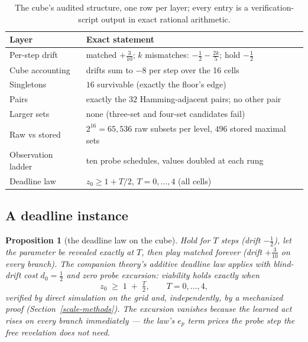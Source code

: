 \documentclass[10pt,twocolumn]{article}
\theoremstyle{plain}
\newtheorem{proposition}[theorem]{Proposition}
\theoremstyle{definition}
\theoremstyle{remark}
\begin{document}
\begin{table}[t]
\centering\footnotesize
\caption{The cube's audited structure, one row per layer; every entry is a
verification-script output in exact rational arithmetic.}
\label{scale-tab:glance}
\begin{tabular}{@{}l p{4.9cm}@{}}
\toprule
Layer & Exact statement \\
\midrule
Per-step drift & matched $+\tfrac3{10}$; $k$ mismatches: $-\tfrac12-\tfrac{2k}{5}$; hold $-\tfrac12$ \\
Cube accounting & drifts sum to $-8$ per step over the 16 cells \\
Singletons & $16$ survivable (exactly the floor's edge) \\
Pairs & exactly the $32$ Hamming-adjacent pairs; no other pair \\
Larger sets & none (three-set and four-set candidates fail) \\
Raw vs stored & $2^{16} = 65{,}536$ raw subsets per level, $496$ stored maximal sets \\
Observation ladder & ten probe schedules, values doubled at each rung \\
Deadline law & $z_0 \ge 1 + T/2$, $T = 0, \dots, 4$ (all cells) \\
\bottomrule
\end{tabular}
\end{table}

\subsection{A deadline instance}\label{scale-deadline}

\begin{proposition}[the deadline law on the cube]\label{scale-prop:deadline}
Hold for \(T\) steps (drift \(-\tfrac12\)), let the parameter be
revealed exactly at \(T\), then play matched forever (drift
\(+\tfrac3{10}\) on every branch). The companion theory's additive
deadline law applies with blind-drift cost \(d_{0} = \tfrac12\) and
zero probe excursion: viability holds exactly when
\[
z_{0} \;\ge\; 1 \;+\; \tfrac{T}{2}, \qquad T = 0, \dots, 4,
\]
verified by direct simulation on the grid and, independently, by a
mechanized proof (Section~\ref{scale-methods}). The excursion vanishes
because the learned act rises on every branch immediately --- the
law's \(e_{p}\) term prices the probe step the free revelation does
not need.
\end{proposition}
\end{document}
